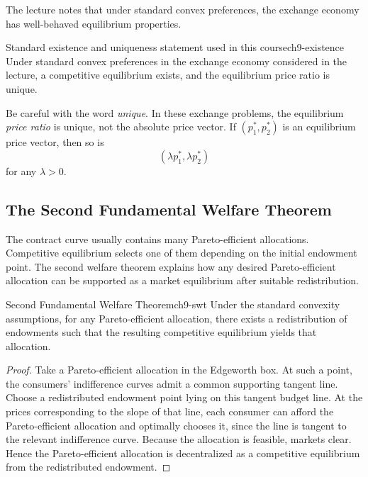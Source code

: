 The lecture notes that under standard convex preferences, the exchange economy has well-behaved equilibrium properties.

\begin{theorem}{Standard existence and uniqueness statement used in this course}{ch9-existence}
Under standard convex preferences in the exchange economy considered in the lecture, a competitive equilibrium exists, and the equilibrium price ratio is unique.
\end{theorem}

\begin{examtip}
Be careful with the word \emph{unique}. In these exchange problems, the equilibrium \emph{price ratio} is unique, not the absolute price vector. If $(p_1^*,p_2^*)$ is an equilibrium price vector, then so is
\[
(\lambda p_1^*, \lambda p_2^*)
\]
for any $\lambda>0$.
\end{examtip}

\subsection{The Second Fundamental Welfare Theorem}

The contract curve usually contains many Pareto-efficient allocations. Competitive equilibrium selects one of them depending on the initial endowment point. The second welfare theorem explains how any desired Pareto-efficient allocation can be supported as a market equilibrium after suitable redistribution.

\begin{theorem}{Second Fundamental Welfare Theorem}{ch9-swt}
Under the standard convexity assumptions, for any Pareto-efficient allocation, there exists a redistribution of endowments such that the resulting competitive equilibrium yields that allocation.
\end{theorem}

\begin{proof}
Take a Pareto-efficient allocation in the Edgeworth box. At such a point, the consumers' indifference curves admit a common supporting tangent line. Choose a redistributed endowment point lying on this tangent budget line. At the prices corresponding to the slope of that line, each consumer can afford the Pareto-efficient allocation and optimally chooses it, since the line is tangent to the relevant indifference curve. Because the allocation is feasible, markets clear. Hence the Pareto-efficient allocation is decentralized as a competitive equilibrium from the redistributed endowment.
\end{proof}

